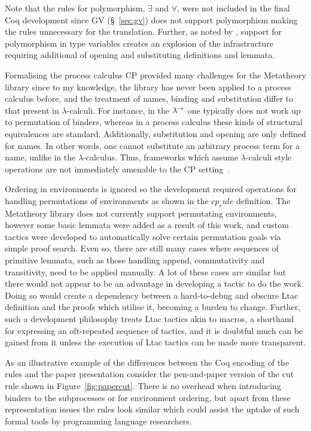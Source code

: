 Note that the rules for polymorphism, $\exists$ and $\forall$, were not
included in the final Coq development since GV (\S~\ref{sec:gv}) does not
support polymorphism making the rules unnecessary for the
translation. Further, as noted by \citeauthor{Lee:2012}, support for
polymorphism in type variables creates an explosion of the infrastructure
requiring additional of opening and substituting definitions and lemmata.

Formalising the process calculus CP provided many challenges for the
Metatheory library since to my knowledge, the library has never been applied
to a process calculus before, and the treatment of names, binding and
substitution differ to that present in $\lambda$-calculi. For instance, in the
$\lambda^\rightarrow$ one typically does not work up to permutation of binders, whereas in a
process calculus these kinds of structural equivalences are
standard. Additionally, substitution and opening are only defined for
names. In other words, one cannot substitute an arbitrary process term for a
name, unlike in the $\lambda$-calculus. Thus, frameworks which assume
$\lambda$-calculi style operations are not immediately amenable to the CP
setting~\cite{Lee:2012}.

Ordering in environments is ignored so the development required operations for
handling permutations of environments as shown in the \coqe$cp_rule$
definition. The Metatheory library does not currently support permutating
environments, however some basic lemmata were added as a result of this work,
and custom tactics were developed to automatically solve certain permutation
goals via simple proof search. Even so, there are still many cases where
sequences of primitive lemmata, such as those handling append, commutativity
and transitivity, need to be applied manually. A lot of these cases are
similar but there would not appear to be an advantage in developing a tactic
to do the work. Doing so would create a dependency between a hard-to-debug and
obscure Ltac definition and the proofs which utilise it, becoming a burden to
change. Further, such a development philosophy treats Ltac tactics akin to
macros, a shorthand for expressing an oft-repeated sequence of tactics, and it
is doubtful much can be gained from it unless the execution of Ltac tactics
can be made more transparent.

As an illustrative example of the differences between the Coq encoding of the
rules and the paper presentation consider the pen-and-paper version of the cut
rule shown in Figure~\ref{fig:papercut}. There is no overhead when introducing
binders to the subprocesses or for environment ordering, but apart from these
representation issues the rules look similar which could assist the uptake of
such formal tools by programming language researchers.

